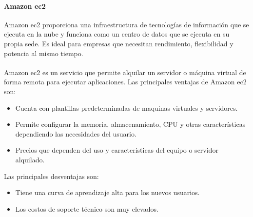 \documentclass[12pt, a4paper, titlepage]{report}
\begin{document}

		   	\paragraph{Amazon \acrshort{ec2} \\}
		   	Amazon \acrfull{ec2} \cite{amazon_ec2}proporciona una infraestructura de tecnologías de información que se ejecuta en la nube y funciona como un centro de datos que se ejecuta en su propia sede. Es ideal para empresas que necesitan rendimiento, flexibilidad y potencia al mismo tiempo.\\\\
		   	Amazon \acrshort{ec2} es un servicio que permite alquilar un servidor o máquina virtual de forma remota para ejecutar aplicaciones.	
		   	Las principales ventajas de Amazon \acrshort{ec2} son: 
		   	\begin{itemize}
		   		\item Cuenta con plantillas predeterminadas de maquinas virtuales y servidores.
		   		\item Permite configurar la memoria, almacenamiento, CPU y otras características dependiendo las necesidades del usuario.
		   		\item Precios que dependen del uso y características del equipo o servidor alquilado.
		   	\end{itemize}
		   	
		   	Las principales desventajas son: 
		   	\begin{itemize}
		   		\item Tiene una curva de aprendizaje alta para los nuevos usuarios.
		   		\item Los costos de soporte técnico son muy elevados.
		   	\end{itemize}		
		   	
\end{document}
